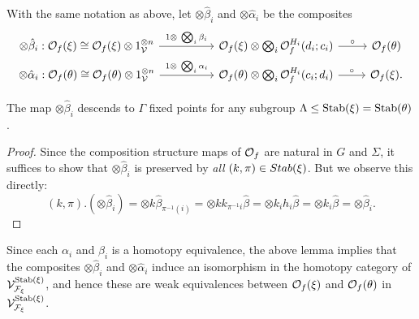 \documentclass[psamsfonts,oneside,10pt,letterpaper
,draft
]{amsart}%
\renewcommand{\F}{\mathcal F}
\renewcommand{\1}{\ensuremath{\mathbb{id}}}
\begin{document}
With the same notation as above, let $\otimes \hat \beta_i$ and $\otimes \hat \alpha_i$ be the composites
\begin{equation}
      \begin{tikzcd}[row sep = tiny]
            \otimes \hat \beta_i :
            \O_f(\ksi)
            \cong
            \O_f(\ksi) \otimes 1_\V^{\otimes n} \arrow[rr, "1 \otimes\ \bigotimes_i \beta_i"]
            &&
            \O_f(\ksi) \otimes \bigotimes_i \O_f^{H_i}(d_i;c_i) \arrow[r,"\circ"]
            &
            \O_f(\theta)
            \\
            \otimes \hat \alpha_i : 
            \O_f(\theta)
            \cong
            \O_f(\theta) \otimes 1_\V^{\otimes n} \arrow[rr, "1 \otimes\ \bigotimes_i \alpha_i"]
            &&
            \O_f(\theta) \otimes \bigotimes_i \O_f^{H_i}(c_i;d_i) \arrow[r,"\circ"]
            &
            \O_f(\ksi).
      \end{tikzcd}
\end{equation}

\begin{lemma}
      The map $\otimes \hat \beta_i$ descends to $\Gamma$ fixed points for any subgroup $\Lambda\leq \mathrm{Stab}(\xi) = \mathrm{Stab}(\theta)$.
\end{lemma}
\begin{proof}
      Since the composition structure maps of $\mathcal{O}_f$ are natural in $G$ and $\Sigma$,
      it suffices to show that $\otimes \hat \beta_i$ is preserved by \textit{all} $(k,\pi)\in Stab(\xi)$.
      But we observe this directly:
      \begin{equation}
            (k, \pi) . (\otimes \hat \beta_i)
            =
            \otimes k \hat\beta_{\pi^{-1}(i)}
            =
            \otimes k k_{\pi^{-1}i} \hat \beta
            =
            \otimes k_i h_i \hat \beta
            =
            \otimes k_i \hat \beta
            =
            \otimes \hat \beta_i.
      \end{equation}
\end{proof}

Since each $\alpha_i$ and $\beta_i$ is a homotopy equivalence,
the above lemma implies that the composites $\otimes \hat \beta_i$ and $\otimes \hat \alpha_i$
induce an isomorphism in the homotopy category of $\V^{\Stab(\ksi)}_{\F_\ksi}$,
and hence these are weak equivalences between $\mathcal{O}_f(\xi)$ and $\mathcal{O}_f(\theta)$ in $\V^{\Stab(\ksi)}_{\F_\ksi}$.
\end{document}
